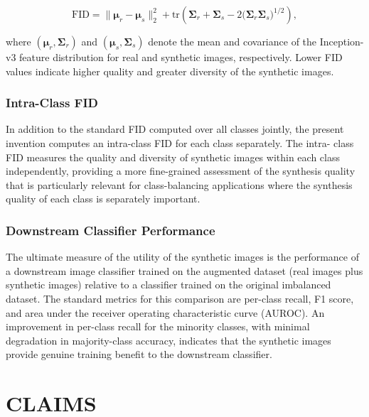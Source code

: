 \documentclass[12pt,letterpaper]{article}
\begin{document}
\begin{equation}
  \text{FID} = \|\bm{\mu}_r - \bm{\mu}_s\|_2^2
    + \text{tr}\!\left(\bm{\Sigma}_r + \bm{\Sigma}_s
      - 2\bigl(\bm{\Sigma}_r \bm{\Sigma}_s\bigr)^{1/2}\right),
  \label{eq:fid}
\end{equation}

\noindent where $(\bm{\mu}_r, \bm{\Sigma}_r)$ and $(\bm{\mu}_s, \bm{\Sigma}_s)$
denote the mean and covariance of the Inception-v3 feature distribution for
real and synthetic images, respectively. Lower FID values indicate higher
quality and greater diversity of the synthetic images.

\subsubsection{Intra-Class FID}

In addition to the standard FID computed over all classes jointly, the present
invention computes an intra-class FID for each class separately. The intra-
class FID measures the quality and diversity of synthetic images within each
class independently, providing a more fine-grained assessment of the synthesis
quality that is particularly relevant for class-balancing applications where
the synthesis quality of each class is separately important.

\subsubsection{Downstream Classifier Performance}

The ultimate measure of the utility of the synthetic images is the performance
of a downstream image classifier trained on the augmented dataset (real images
plus synthetic images) relative to a classifier trained on the original
imbalanced dataset. The standard metrics for this comparison are per-class
recall, F1 score, and area under the receiver operating characteristic curve
(AUROC). An improvement in per-class recall for the minority classes, with
minimal degradation in majority-class accuracy, indicates that the synthetic
images provide genuine training benefit to the downstream classifier.

\newpage
\section*{CLAIMS}
\end{document}
